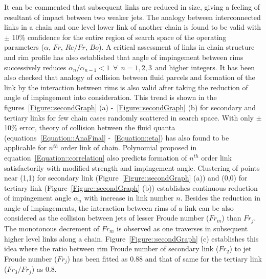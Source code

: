 It can be commented that subsequent links are reduced in size, giving a feeling of resultant of impact between two weaker jets. The analogy between interconnected links in a chain and one level lower link of another chain is found to be valid with $\pm$ 10\% confidence for the entire region of search space of the operating parameters ($\alpha$, $Fr$, $Re/Fr$, $Bo$). A critical assessment of links in chain structure and rim profile has also established that angle of impingement between rims successively reduces $\alpha_{n}/\alpha_{n-1} < 1 \:\:\forall\:\: n = 1, 2, 3 \:\:\text{and higher integers}$. It has been also checked that analogy of collision between fluid parcels and formation of the link by the interaction between rims is also valid after taking the reduction of angle of impingement into consideration. This trend is shown in the figures~\ref{Figure::secondGraph} (a) -~\ref{Figure::secondGraph} (b) for secondary and tertiary links for few chain cases randomly scattered in search space. With only $\pm$ 10\% error, theory of collision between the fluid quanta (equations~\ref{Equation::AnaFinal} -~\ref{Equation::eta}) has also found to be applicable for $n^{th}$ order link of chain. Polynomial proposed in equation~\ref{Equation::correlation} also predicts formation of $n^{th}$ order link satisfactorily with modified strength and impingement angle. Clustering of points near (1,1) for secondary link (Figure~\ref{Figure::secondGraph} (a)) and (0,0) for tertiary link (Figure~\ref{Figure::secondGraph} (b)) establishes continuous reduction of impingement angle $\alpha_{n}$ with increase in link number $n$. Besides the reduction in angle of impingements, the interaction between rims of a link can be also considered as the collision between jets of lesser Froude number ($Fr_m$) than $Fr_j$. The monotonous decrement of $Fr_m$ is observed as one traverses in subsequent higher level links along a chain. Figure~\ref{Figure::secondGraph} (c) establishes this idea where the ratio between rim Froude number of secondary link ($Fr_2$) to jet Froude number ($Fr_j$) has been fitted as 0.88 and that of same for the tertiary link ($Fr_3/Fr_j$) as 0.8.\\
